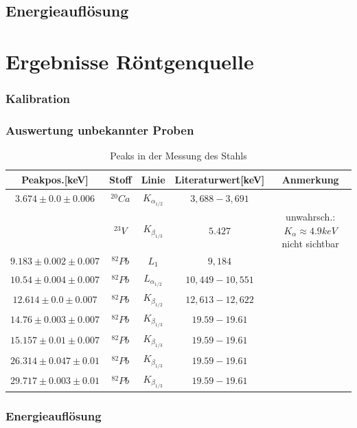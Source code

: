 \documentclass[12pt,a4paper]{article}
\begin{document}
\subsection{Energieauflösung}
\section{Ergebnisse Röntgenquelle}
\subsubsection{Kalibration}
\subsubsection{Auswertung unbekannter Proben}
\begin{table}
\center
\begin{tabular}{|c|c|c|c|c|}
\hline 
Peakpos.[keV] & Stoff & Linie & Literaturwert[keV] & Anmerkung \\
\hline 
$3.674 \pm 0.0 \pm 0.006$& $^{20}Ca$ & $K_{\alpha_{1/2}}$ & $3,688-3,691$ & \\ 
& $^{23}V$ & $K_{\beta_{1/3}}$ & $5.427$ & unwahrsch.: $K_{\alpha}\approx 4.9keV$ nicht sichtbar\\ 
\hline 
$9.183 \pm 0.002 \pm 0.007$ & $^{82}Pb$ & $L_{1}$ & $9,184$ & \\ 
\hline 
$10.54 \pm 0.004 \pm 0.007$ & $^{82}Pb$ & $L_{\alpha_{1/2}}$ & $10,449-10,551$ & \\
\hline
$12.614 \pm 0.0 \pm 0.007$ & $^{82}Pb$ & $K_{\beta_{1/2}}$ & $12,613-12,622$ & \\
\hline
$14.76 \pm 0.003 \pm 0.007$ & $^{82}Pb$ & $K_{\beta_{1/3}}$ & $19.59-19.61$ & \\
\hline
$15.157 \pm 0.01 \pm 0.007$ & $^{82}Pb$ & $K_{\beta_{1/3}}$ & $19.59-19.61$ & \\
\hline
$26.314 \pm 0.047 \pm 0.01$ & $^{82}Pb$ & $K_{\beta_{1/3}}$ & $19.59-19.61$ & \\
\hline
$29.717 \pm 0.003 \pm 0.01$ & $^{82}Pb$ & $K_{\beta_{1/3}}$ & $19.59-19.61$ & \\
\hline
\end{tabular} 
\caption{Peaks in der Messung des Stahls}
\label{a_peaks_leer}
\end{table}
\caption{•}
\subsubsection{Energieauflösung}
\end{document}
